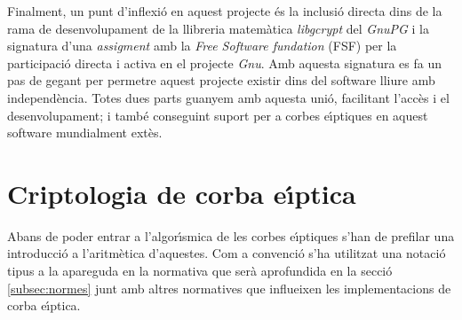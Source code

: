 \documentclass[12pt,twoside,catalan,a4paper]{book}%
\numberwithin{figure}{section}		%
\theoremstyle{definition}   			%
\def\ce{corba e\lgem{}\'{\i}ptica}%
\def\ces{corbes e\lgem{}\'{\i}ptiques}%
\theoremstyle{saltolinea}   			%
\begin{document}
Finalment, un punt d'inflexi\'o en aquest projecte \'es la inclusi\'o directa dins de la rama de desenvolupament de la llibreria matem\`atica \emph{libgcrypt} del \emph{GnuPG} i la signatura d'una \emph{assigment} amb la \emph{Free Software fundation} (FSF) per la participaci\'o directa i activa en el projecte \emph{Gnu}. Amb aquesta signatura es fa un pas de gegant per permetre aquest projecte existir dins del software lliure amb independ\`encia. Totes dues parts guanyem amb aquesta uni\'o, facilitant l'acc\`es i el desenvolupament; i tamb\'e conseguint suport per a \ces{} en aquest software mundialment ext\`es.


\chapter{Criptologia de \ce}\label{ch:criptologiaEC}

Abans de poder entrar a l'algor\'{\i}smica de les \ces{} s'han de prefilar una introducci\'o a l'aritm\`etica d'aquestes. Com a convenci\'o s'ha utilitzat una notaci\'o tipus a la apareguda en la normativa \cite{P1363} que ser\`a aprofundida en la secci\'o \ref{subsec:normes} junt amb altres normatives que influeixen les implementacions de \ce{}.

\end{document}
